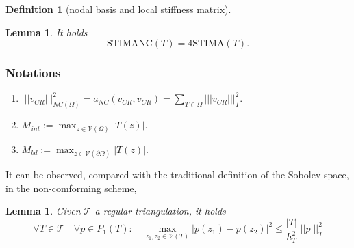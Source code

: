 \documentclass[a4paper,12pt,oneside,fleqn]{book}
\newtheorem{lemma}[theorem]{Lemma}
\theoremstyle{definition}
\newtheorem{definition}{Definition}[section]
\theoremstyle{remark}
\begin{document}
\begin{definition}[nodal basis and local stiffness matrix]
\end{definition}

\begin{lemma}
	It holds
	\begin{equation}
		\text{STIMANC}(T) = 4 \text{STIMA}(T).
	\end{equation}
\end{lemma}

\subsubsection{Notations}
\begin{enumerate}
	\item $||| v_{CR}|||_{NC(\Omega)}^2 = a_{NC}(v_{CR}, v_{CR})= \sum_{T \in \Omega} |||v_{CR}|||_T^2$. 
	\item $M_{int}:= \max_{z \in \mathcal{V}(\Omega)} |T(z)|$.
	\item $M_{bd}:= \max_{z \in \mathcal{V}(\partial\Omega)} |T(z)|$.
\end{enumerate}





It can be observed, compared with the traditional definition of the Sobolev space, in the non-comforming scheme, 


\begin{lemma}
	Given $\mathcal{T}$ a regular triangulation, it holds
	\begin{equation}
		\forall T \in \mathcal{T} \quad \forall p \in P_1(T): \quad \max_{z_1, z_2 \in \mathcal{V}(T)}|p(z_1) - p(z_2)|^2 \le \frac{|T|}{h_T^2}|||p|||_T^2 
	\end{equation}
\end{lemma}
\end{document}
